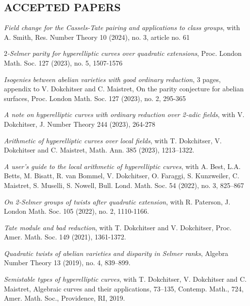 \documentclass{res}
\begin{document}
\begin{resume}
\section{ACCEPTED PAPERS}         
        
        
        
\bigskip

\vspace{-0.1in}	

{\it Field change for the Cassels-Tate pairing and applications to class groups}, with A. Smith, Res. Number Theory 10 (2024), no. 3, article no. 61 \

{\it $2$-Selmer parity for hyperelliptic curves over quadratic extensions},  Proc. London Math. Soc. 127 (2023), no. 5, 1507-1576 \

{\it Isogenies between abelian varieties with good ordinary reduction}, 3 pages, appendix to  V. Dokchitser and C. Maistret, {On the parity conjecture for abelian surfaces}, Proc. London Math. Soc. 127 (2023), no. 2, 295-365 \

\vspace{-0.1in}	
{\it A note on hyperelliptic curves with ordinary reduction over 2-adic fields}, with V. Dokchitser, J. Number Theory 244 (2023), 264-278\

\vspace{-0.1in}	
{\it Arithmetic of hyperelliptic curves over local fields}, with T. Dokchitser, V. Dokchitser and C. Maistret, Math. Ann. 385 (2023), 1213–1322.  \

{\it A user's guide to the local arithmetic of hyperelliptic curves}, with A. Best, L.A. Betts, M. Bisatt, R. van Bommel, V. Dokchitser, O. Faraggi, S. Kunzweiler, C. Maistret, S. Muselli, S. Nowell,  Bull. Lond. Math. Soc. 54 (2022), no. 3, 825--867

{\it On 2-Selmer groups of twists after quadratic extension}, with R. Paterson, J. London Math. Soc. 105 (2022), no. 2, 1110-1166. \

{\it Tate module and bad reduction}, with T. Dokchitser and V. Dokchitser, Proc. Amer. Math. Soc. 149 (2021), 1361-1372.

{\it Quadratic twists of abelian varieties and disparity in Selmer ranks},  Algebra Number Theory 13 (2019), no. 4, 839–899. \

{\it Semistable types of hyperelliptic curves}, with T. Dokchitser, V. Dokchitser and C. Maistret, Algebraic curves and their applications, 73–135, Contemp. Math., 724, Amer. Math. Soc., Providence, RI, 2019. \


\end{resume}
\end{document}
